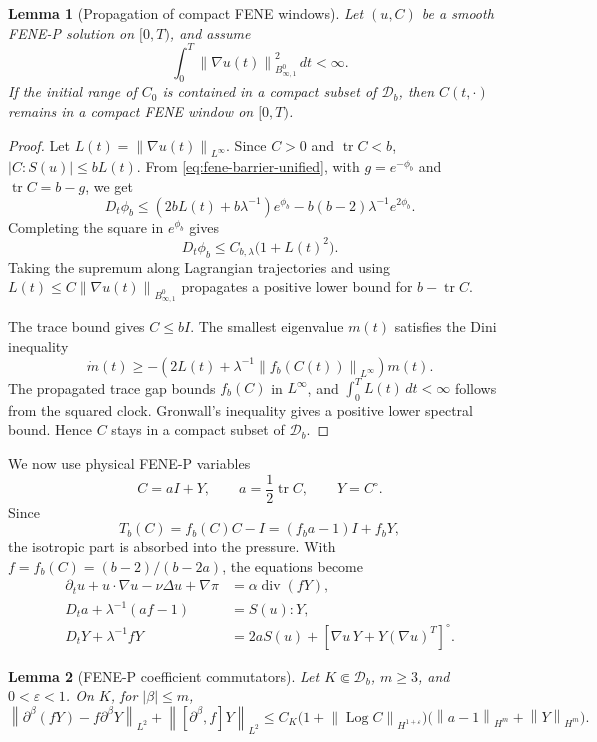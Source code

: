 \documentclass[11pt]{article}
\newtheorem{lemma}{Lemma}[section]
\newcommand{\Id}{I}
\newcommand{\tr}{\operatorname{tr}}
\newcommand{\divv}{\operatorname{div}}
\newcommand{\Log}{\operatorname{Log}}
\newcommand{\calD}{\mathcal D}
\newcommand{\eps}{\varepsilon}
\newcommand{\norm}[1]{\left\lVert #1\right\rVert}
\newcommand{\Besov}{B^0_{\infty,1}}
\begin{document}
\begin{lemma}[Propagation of compact FENE windows]
\label{lem:fene-window-propagation}
Let \((u,C)\) be a smooth FENE-P solution on \([0,T)\), and assume
\[
  \int_0^T\norm{\nabla u(t)}_{\Besov}^2\,dt<\infty .
\]
If the initial range of \(C_0\) is contained in a compact subset of
\(\calD_b\), then \(C(t,\cdot)\) remains in a compact FENE window on
\([0,T)\).
\end{lemma}

\begin{proof}
Let \(L(t)=\norm{\nabla u(t)}_{L^\infty}\).  Since \(C>0\) and \(\tr C<b\),
\(|C:S(u)|\le bL(t)\).  From \eqref{eq:fene-barrier-unified}, with
\(g=e^{-\phi_b}\) and \(\tr C=b-g\), we get
\[
  D_t\phi_b
  \le
  \left(2bL(t)+b\lambda^{-1}\right)e^{\phi_b}
  -b(b-2)\lambda^{-1}e^{2\phi_b}.
\]
Completing the square in \(e^{\phi_b}\) gives
\[
  D_t\phi_b\le C_{b,\lambda}\bigl(1+L(t)^2\bigr).
\]
Taking the supremum along Lagrangian trajectories and using
\(L(t)\le C\norm{\nabla u(t)}_{\Besov}\) propagates a positive lower bound for
\(b-\tr C\).

The trace bound gives \(C\le bI\).  The smallest eigenvalue \(m(t)\) satisfies
the Dini inequality
\[
  \dot m(t)\ge
  -\left(2L(t)+\lambda^{-1}\norm{f_b(C(t))}_{L^\infty}\right)m(t).
\]
The propagated trace gap bounds \(f_b(C)\) in \(L^\infty\), and
\(\int_0^T L(t)\,dt<\infty\) follows from the squared clock.  Gronwall's
inequality gives a positive lower spectral bound.  Hence \(C\) stays in a
compact subset of \(\calD_b\).
\end{proof}

We now use physical FENE-P variables
\[
  C=aI+Y,\qquad a=\frac12\tr C,\qquad Y=C^\circ .
\]
Since
\[
  T_b(C)=f_b(C)C-\Id=(f_ba-1)I+f_bY,
\]
the isotropic part is absorbed into the pressure.  With
\(f=f_b(C)=(b-2)/(b-2a)\), the equations become
\begin{align}
  \partial_tu+u\cdot\nabla u-\nu\Delta u+\nabla\pi
    &=\alpha\divv(fY), \label{eq:fene-physical-u}\\
  D_ta+\lambda^{-1}(af-1)&=S(u):Y,
    \label{eq:fene-physical-a}\\
  D_tY+\lambda^{-1}fY
    &=2aS(u)+[\nabla u\,Y+Y(\nabla u)^T]^\circ .
    \label{eq:fene-physical-Y}
\end{align}

\begin{lemma}[FENE-P coefficient commutators]
\label{lem:fene-coefficient-commutators}
Let \(K\Subset\calD_b\), \(m\ge3\), and \(0<\eps<1\).  On \(K\), for
\(|\beta|\le m\),
\[
  \norm{\partial^\beta(fY)-f\partial^\beta Y}_{L^2}
  +\norm{[\partial^\beta,f]Y}_{L^2}
  \le
  C_K\bigl(1+\norm{\Log C}_{H^{1+\eps}}\bigr)
  \bigl(\norm{a-1}_{H^m}+\norm{Y}_{H^m}\bigr).
\]
\end{lemma}
\end{document}
